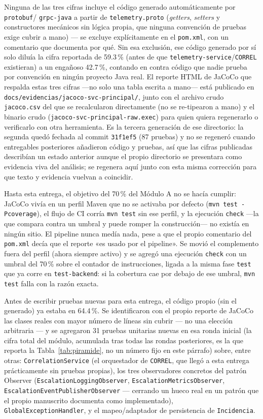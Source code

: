 Ninguna de las tres cifras incluye el código generado automáticamente por \texttt{protobuf}/
\texttt{grpc-java} a partir de \texttt{telemetry.proto} (\emph{getters}, \emph{setters} y
constructores mecánicos sin lógica propia, que ninguna convención de pruebas exige cubrir a
mano) — se excluye explícitamente en el \texttt{pom.xml}, con un comentario que documenta por
qué. Sin esa exclusión, ese código generado por sí solo diluía la cifra reportada de 59.3\,\%
(antes de que \texttt{telemetry-service}/\texttt{CORREL} existieran) a un engañoso 42.7\,\%,
contando en contra código que nadie prueba por convención en ningún proyecto Java real. El
reporte HTML de JaCoCo que respalda estas tres cifras —no solo una tabla escrita a mano— está
publicado en \texttt{docs/evidencias/jacoco-svc-principal/}, junto con el archivo crudo
\texttt{jacoco.csv} del que se recalcularon directamente (no se re-tipearon a mano) y el binario
crudo (\texttt{jacoco-svc-principal-raw.exec}) para quien quiera regenerarlo o verificarlo con
otra herramienta. Es la tercera generación de ese directorio: la segunda quedó fechada al
commit \texttt{31f1ef5} (87 pruebas) y no se regeneró cuando entregables posteriores añadieron
código y pruebas, así que las cifras publicadas describían un estado anterior aunque el propio
directorio se presentara como evidencia viva del análisis; se regenera aquí junto con esta
misma corrección para que texto y evidencia vuelvan a coincidir.

Hasta esta entrega, el objetivo del 70\,\% del Módulo A no se hacía cumplir: JaCoCo vivía en un
perfil Maven que no se activaba por defecto (\texttt{mvn test -Pcoverage}), el flujo de CI corría
\texttt{mvn test} sin ese perfil, y la ejecución \texttt{check} —la que compara contra un
umbral y puede romper la construcción— no existía en ningún sitio. El pipeline nunca medía nada,
pese a que el propio comentario del \texttt{pom.xml} decía que el reporte «es usado por el
pipeline». Se movió el complemento fuera del perfil (ahora siempre activo) y se agregó una
ejecución \texttt{check} con un umbral del 70\,\% sobre el contador de instrucciones, ligada a la
misma fase \texttt{test} que ya corre en \texttt{test-backend}: si la cobertura cae por debajo de
ese umbral, \texttt{mvn test} falla con la razón exacta.

Antes de escribir pruebas nuevas para esta entrega, el código propio (sin el generado) ya estaba
en 64.4\,\%. Se identificaron con el propio reporte de JaCoCo las clases reales con mayor número
de líneas sin cubrir — no una elección arbitraria — y se agregaron 31 pruebas unitarias nuevas en
esa ronda inicial (la cifra total del módulo, acumulada tras todas las rondas posteriores, es la
que reporta la Tabla~\ref{tab:piramide}, no un número fijo en este párrafo) sobre, entre otras:
\texttt{CorrelationService} (el
orquestador de \texttt{CORREL}, que llegó a esta entrega prácticamente sin pruebas propias), los
tres observadores concretos del patrón Observer (\texttt{EscalationLoggingObserver},
\texttt{EscalationMetricsObserver}, \texttt{EscalationEventPublisherObserver} — cerrando un hueco
real en un patrón que el propio manuscrito documenta como implementado), \texttt{
GlobalExceptionHandler}, y el mapeo/adaptador de persistencia de \texttt{Incidencia}.

